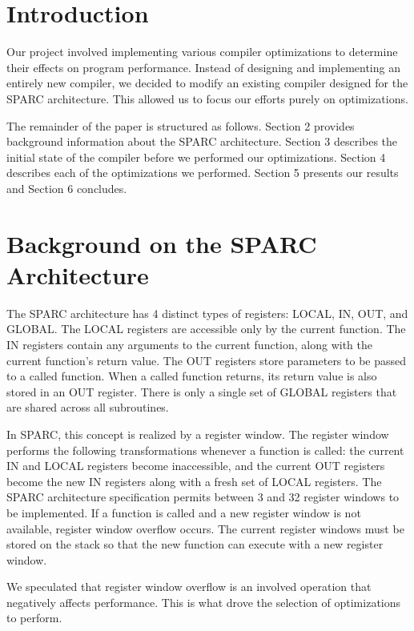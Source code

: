 \documentclass[12pt]{article}
\begin{document}
\begin{multicols}{2}

\section{Introduction}
Our project involved implementing various compiler optimizations to determine their effects on program performance.
Instead of designing and implementing an entirely new compiler, we decided to modify an existing compiler designed for the SPARC architecture.
This allowed us to focus our efforts purely on optimizations.

The remainder of the paper is structured as follows.
Section 2 provides background information about the SPARC architecture.
Section 3 describes the initial state of the compiler before we performed our optimizations.
Section 4 describes each of the optimizations we performed.
Section 5 presents our results and Section 6 concludes.

\section{Background on the SPARC Architecture}
The SPARC architecture has 4 distinct types of registers: LOCAL, IN, OUT, and GLOBAL.
The LOCAL registers are accessible only by the current function.
The IN registers contain any arguments to the current function, along with the current function’s return value.
The OUT registers store parameters to be passed to a called function.
When a called function returns, its return value is also stored in an OUT register.
There is only a single set of GLOBAL registers that are shared across all subroutines.

In SPARC, this concept is realized by a register window.
The register window performs the following transformations whenever a function is called: the current IN and LOCAL registers become inaccessible, and the current OUT registers become the new IN registers along with a fresh set of LOCAL registers.
The SPARC architecture specification permits between 3 and 32 register windows to be implemented.
If a function is called and a new register window is not available, register window overflow occurs.
The current register windows must be stored on the stack so that the new function can execute with a new register window.

We speculated that register window overflow is an involved operation that negatively affects performance.
This is what drove the selection of optimizations to perform.


\end{multicols}
\end{document}
